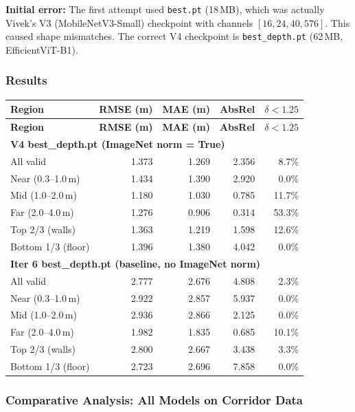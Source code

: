 \documentclass[11pt,a4paper]{article}
\begin{document}
\textbf{Initial error:} The first attempt used \texttt{best.pt} (18\,MB),
which was actually Vivek's V3 (MobileNetV3-Small) checkpoint with channels
$[16, 24, 40, 576]$. This caused shape mismatches. The correct V4 checkpoint
is \texttt{best\_depth.pt} (62\,MB, EfficientViT-B1).

\subsubsection{Results}

\begin{longtable}{lrrrr}
\toprule
\textbf{Region} & \textbf{RMSE (m)} & \textbf{MAE (m)} & \textbf{AbsRel} & \textbf{$\delta < 1.25$} \\
\midrule
\endfirsthead
\toprule
\textbf{Region} & \textbf{RMSE (m)} & \textbf{MAE (m)} & \textbf{AbsRel} & \textbf{$\delta < 1.25$} \\
\midrule
\endhead
\multicolumn{5}{l}{\textbf{V4 best\_depth.pt (ImageNet norm = True)}} \\
\midrule
All valid          & 1.373 & 1.269 & 2.356 &  8.7\% \\
Near (0.3--1.0\,m) & 1.434 & 1.390 & 2.920 &  0.0\% \\
Mid (1.0--2.0\,m)  & 1.180 & 1.030 & 0.785 & 11.7\% \\
Far (2.0--4.0\,m)  & 1.276 & 0.906 & 0.314 & 53.3\% \\
Top 2/3 (walls)    & 1.363 & 1.219 & 1.598 & 12.6\% \\
Bottom 1/3 (floor) & 1.396 & 1.380 & 4.042 &  0.0\% \\
\midrule
\multicolumn{5}{l}{\textbf{Iter 6 best\_depth.pt (baseline, no ImageNet norm)}} \\
\midrule
All valid          & 2.777 & 2.676 & 4.808 &  2.3\% \\
Near (0.3--1.0\,m) & 2.922 & 2.857 & 5.937 &  0.0\% \\
Mid (1.0--2.0\,m)  & 2.936 & 2.866 & 2.125 &  0.0\% \\
Far (2.0--4.0\,m)  & 1.982 & 1.835 & 0.685 & 10.1\% \\
Top 2/3 (walls)    & 2.800 & 2.667 & 3.438 &  3.3\% \\
Bottom 1/3 (floor) & 2.723 & 2.696 & 7.858 &  0.0\% \\
\bottomrule
\end{longtable}

\subsubsection{Comparative Analysis: All Models on Corridor Data}
\end{document}
